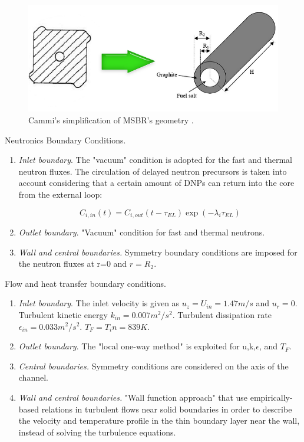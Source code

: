 \documentclass{article}
\begin{document}
\begin{figure}[htpb]
  \centering
  \includegraphics[max height=.5\textheight,max width=\textwidth,keepaspectratio]{Cammi_simplification_1.png}
  \caption{Cammi's simplification of MSBR's geometry 
        \cite{cammi_multi-physics_2011}.}
  \label{fig:simlification}
\end{figure}

Neutronics Boundary Conditions.
\begin{enumerate}
	\item \textit{Inlet boundary}. The "vacuum" condition is adopted for the fast and thermal neutron fluxes. The circulation of delayed neutron precursors is taken into account considering that a certain amount of DNPs can return into the core from the external loop:

	\[ C_{i,in}(t) = C_{i,out}(t- \tau_{EL})\exp(- \lambda_i \tau_{EL}) \]
	\item \textit{Outlet boundary}. "Vacuum" condition for fast and thermal neutrons.
	\item \textit{Wall and central boundaries.} Symmetry boundary conditions are imposed for the neutron fluxes at r=0 and $ r=R_2 $.
\end{enumerate}

Flow and heat transfer boundary conditions.
\begin{enumerate}
	\item \textit{Inlet boundary}. The inlet velocity is given as $u_z = U_{in}=1.47 m/s$ and $u_r=0$. Turbulent kinetic energy $k_{in}=0.007 m^2/s^2$. Turbulent dissipation rate $\epsilon_{in}=0.033 m^2/s^2 $. $T_F=T_in=839K$.
	\item \textit{Outlet boundary}. The "local one-way method" is exploited for u,k,$\epsilon$, and $T_F$.
	\item \textit{Central boundaries.} Symmetry conditions are considered on the axis of the channel.
	\item \textit{Wall and central boundaries.} "Wall function approach" that use empirically-based relations in turbulent flows near solid boundaries in order to describe the velocity and temperature profile in the thin boundary layer near the wall, instead of solving the turbulence equations.
\end{enumerate}
\end{document}
